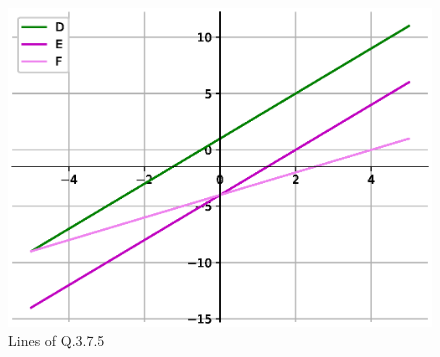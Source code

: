 \begin{enumerate}[label=\thesection.\arabic*.,ref=\thesection.\theenumi]
\begin{figure}[!ht]
	\includegraphics[width=\columnwidth]{./figs/lines/q11b.eps}
	\caption{Lines of Q.3.7.5}
	\label{fig:qelevenb}	
	\end{figure}
	
\end{enumerate}
